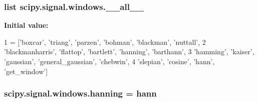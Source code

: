 \subsubsection[{\+\_\+\+\_\+all\+\_\+\+\_\+}]{\setlength{\rightskip}{0pt plus 5cm}list scipy.\+signal.\+windows.\+\_\+\+\_\+all\+\_\+\+\_\+}\label{namespacescipy_1_1signal_1_1windows_a6076af085b01d29a5b5da48e38b8a281}
{\bfseries Initial value\+:}
\begin{DoxyCode}
1 = [\textcolor{stringliteral}{'boxcar'}, \textcolor{stringliteral}{'triang'}, \textcolor{stringliteral}{'parzen'}, \textcolor{stringliteral}{'bohman'}, \textcolor{stringliteral}{'blackman'}, \textcolor{stringliteral}{'nuttall'},
2            \textcolor{stringliteral}{'blackmanharris'}, \textcolor{stringliteral}{'flattop'}, \textcolor{stringliteral}{'bartlett'}, \textcolor{stringliteral}{'hanning'}, \textcolor{stringliteral}{'barthann'},
3            \textcolor{stringliteral}{'hamming'}, \textcolor{stringliteral}{'kaiser'}, \textcolor{stringliteral}{'gaussian'}, \textcolor{stringliteral}{'general\_gaussian'}, \textcolor{stringliteral}{'chebwin'},
4            \textcolor{stringliteral}{'slepian'}, \textcolor{stringliteral}{'cosine'}, \textcolor{stringliteral}{'hann'}, \textcolor{stringliteral}{'get\_window'}]
\end{DoxyCode}
\hypertarget{namespacescipy_1_1signal_1_1windows_afbc14fc8f8fc91f08c82a1674fd0087b}{}
\subsubsection[{hanning}]{\setlength{\rightskip}{0pt plus 5cm}scipy.\+signal.\+windows.\+hanning = {\bf hann}}\label{namespacescipy_1_1signal_1_1windows_afbc14fc8f8fc91f08c82a1674fd0087b}
